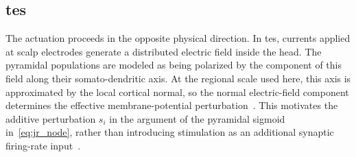 \subsection{\Acl{tes}}
\label{sec:stimulation_interface}

The actuation proceeds in the opposite physical direction.
In \ac{tes}, currents applied at scalp electrodes generate a distributed electric field inside the head.
The pyramidal populations are modeled as being polarized by the component of this field along their somato-dendritic axis.
At the regional scale used here, this axis is approximated by the local cortical normal, so the normal electric-field component determines the effective membrane-potential perturbation~\cite{Merlet2013,Kunze2016}.
This motivates the additive perturbation $s_i$ in the argument of the pyramidal sigmoid in~\eqref{eq:jr_node}, rather than introducing stimulation as an additional synaptic firing-rate input~\cite{Merlet2013,Yu2024}.

